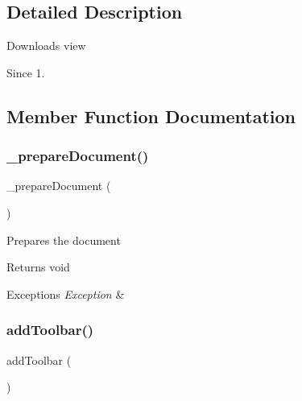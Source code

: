 \subsection{Detailed Description}
Downloads view

\begin{DoxySince}{Since}
1. 
\end{DoxySince}


\subsection{Member Function Documentation}
\mbox{\label{classtks__agenda_view_downloads_aa6beb02534f5e57801141ad50e7adec5}} 
\subsubsection{\+\_\+prepare\+Document()}
{\footnotesize\ttfamily \+\_\+prepare\+Document (\begin{DoxyParamCaption}{ }\end{DoxyParamCaption})\hspace{0.3cm}{\ttfamily [protected]}}

Prepares the document

\begin{DoxyReturn}{Returns}
void
\end{DoxyReturn}

\begin{DoxyExceptions}{Exceptions}
{\em Exception} & \\
\hline
\end{DoxyExceptions}
\mbox{\label{classtks__agenda_view_downloads_af327e89538be614e923c7e5863319f43}} 
\subsubsection{add\+Toolbar()}
{\footnotesize\ttfamily add\+Toolbar (\begin{DoxyParamCaption}{ }\end{DoxyParamCaption})\hspace{0.3cm}{\ttfamily [protected]}}

